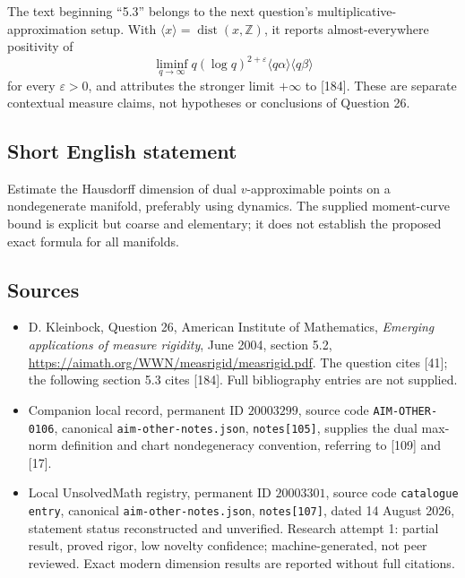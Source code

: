 \documentclass[11pt]{article}
\newcommand{\Z}{\mathbb{Z}}
\begin{document}
The text beginning ``5.3'' belongs to the next question's multiplicative-approximation setup. With $\langle x\rangle=\operatorname{dist}(x,\Z)$, it reports almost-everywhere positivity of
\[
 \liminf_{q\to\infty}q(\log q)^{2+\varepsilon}
       \langle q\alpha\rangle\langle q\beta\rangle
\]
for every $\varepsilon>0$, and attributes the stronger limit $+\infty$ to [184]. These are separate contextual measure claims, not hypotheses or conclusions of Question 26.
\subsection{Short English statement}
Estimate the Hausdorff dimension of dual $v$-approximable points on a nondegenerate manifold, preferably using dynamics. The supplied moment-curve bound is explicit but coarse and elementary; it does not establish the proposed exact formula for all manifolds.
\subsection{Sources}
\begin{itemize}
\item D. Kleinbock, Question 26, American Institute of Mathematics, \emph{Emerging applications of measure rigidity}, June 2004, section 5.2, \url{https://aimath.org/WWN/measrigid/measrigid.pdf}. The question cites [41]; the following section 5.3 cites [184]. Full bibliography entries are not supplied.
\item Companion local record, permanent ID $20003299$, source code \texttt{AIM-OTHER-0106}, canonical \texttt{aim-other-notes.json}, \texttt{notes[105]}, supplies the dual max-norm definition and chart nondegeneracy convention, referring to [109] and [17].
\item Local UnsolvedMath registry, permanent ID $20003301$, source code \texttt{catalogue entry}, canonical \texttt{aim-other-notes.json}, \texttt{notes[107]}, dated 14 August 2026, statement status reconstructed and unverified. Research attempt 1: partial result, proved rigor, low novelty confidence; machine-generated, not peer reviewed. Exact modern dimension results are reported without full citations.
\end{itemize}
\end{document}
